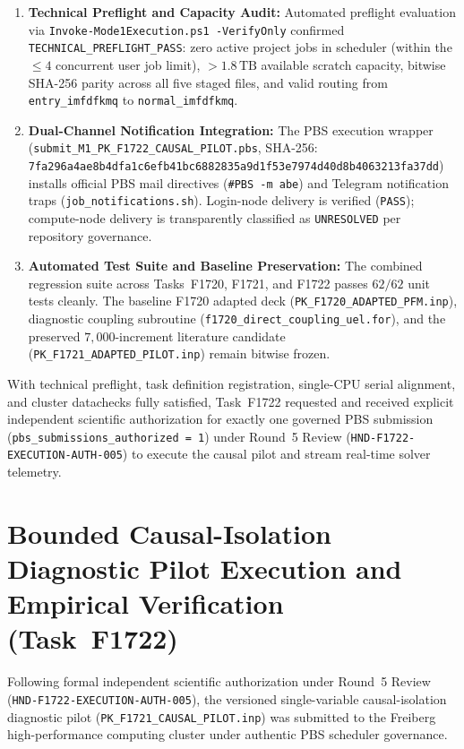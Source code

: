 \begin{enumerate}
  \item \textbf{Technical Preflight and Capacity Audit:}
  Automated preflight evaluation via \texttt{Invoke-Mode1Execution.ps1 -VerifyOnly} confirmed \texttt{TECHNICAL\_PREFLIGHT\_PASS}: zero active project jobs in scheduler (within the $\le 4$ concurrent user job limit), $> 1.8\,\mathrm{TB}$ available scratch capacity, bitwise SHA-256 parity across all five staged files, and valid routing from \texttt{entry\_imfdfkmq} to \texttt{normal\_imfdfkmq}.

  \item \textbf{Dual-Channel Notification Integration:}
  The PBS execution wrapper (\texttt{submit\_M1\_PK\_F1722\_CAUSAL\_PILOT.pbs}, SHA-256: \texttt{7fa296a4ae8b4dfa1c6efb41bc6882835a9d1f53e7974d40d8b4063213fa37dd}) installs official PBS mail directives (\texttt{\#PBS -m abe}) and Telegram notification traps (\texttt{job\_notifications.sh}). Login-node delivery is verified (\texttt{PASS}); compute-node delivery is transparently classified as \texttt{UNRESOLVED} per repository governance.

  \item \textbf{Automated Test Suite and Baseline Preservation:}
  The combined regression suite across Tasks~F1720, F1721, and F1722 passes $62/62$ unit tests cleanly. The baseline F1720 adapted deck (\texttt{PK\_F1720\_ADAPTED\_PFM.inp}), diagnostic coupling subroutine (\texttt{f1720\_direct\_coupling\_uel.for}), and the preserved $7{,}000$-increment literature candidate (\texttt{PK\_F1721\_ADAPTED\_PILOT.inp}) remain bitwise frozen.
\end{enumerate}

With technical preflight, task definition registration, single-CPU serial alignment, and cluster datachecks fully satisfied, Task~F1722 requested and received explicit independent scientific authorization for exactly one governed PBS submission (\texttt{pbs\_submissions\_authorized = 1}) under Round~5 Review (\texttt{HND-F1722-EXECUTION-AUTH-005}) to execute the causal pilot and stream real-time solver telemetry.

\section{Bounded Causal-Isolation Diagnostic Pilot Execution and Empirical Verification (Task~F1722)}
\label{sec:f1722_causal_pilot_execution}

Following formal independent scientific authorization under Round~5 Review (\texttt{HND-F1722-EXECUTION-AUTH-005}), the versioned single-variable causal-isolation diagnostic pilot (\texttt{PK\_F1721\_CAUSAL\_PILOT.inp}) was submitted to the Freiberg high-performance computing cluster under authentic PBS scheduler governance. 

